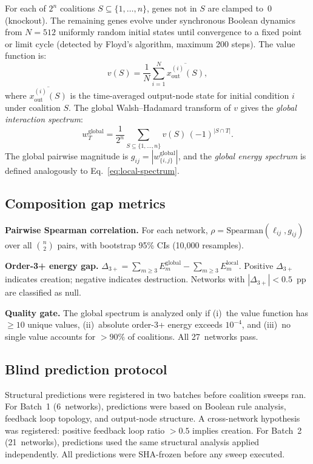 \documentclass[10pt]{article}
\begin{document}
For each of $2^n$ coalitions $S \subseteq \{1,\ldots,n\}$, genes not
in $S$ are clamped to~0 (knockout). The remaining genes evolve under
synchronous Boolean dynamics from $N = 512$ uniformly random initial
states until convergence to a fixed point or limit cycle (detected by
Floyd's algorithm, maximum 200 steps). The value function is:
%
\begin{equation}
\label{eq:value}
v(S) = \frac{1}{N} \sum_{i=1}^{N}
\overline{x_{\mathrm{out}}^{(i)}(S)},
\end{equation}
%
where $\overline{x_{\mathrm{out}}^{(i)}(S)}$ is the time-averaged
output-node state for initial condition $i$ under coalition $S$. The
global Walsh--Hadamard transform of $v$ gives the \emph{global
interaction spectrum}:
%
\begin{equation}
\label{eq:global-wht}
w_T^{\mathrm{global}} = \frac{1}{2^n} \sum_{S \subseteq \{1,\ldots,n\}}
v(S)\,(-1)^{|S \cap T|}.
\end{equation}
%
The global pairwise magnitude is
$g_{ij} = |w_{\{i,j\}}^{\mathrm{global}}|$, and the
\emph{global energy spectrum} is defined analogously to
Eq.~\ref{eq:local-spectrum}.


\subsection{Composition gap metrics}
\label{sec:metrics}

\textbf{Pairwise Spearman correlation.}
For each network, $\rho = \mathrm{Spearman}(\ell_{ij}, g_{ij})$ over
all $\binom{n}{2}$ pairs, with bootstrap 95\% CIs (10{,}000
resamples).

\textbf{Order-3+ energy gap.}
$\Delta_{3+} = \sum_{m \geq 3} E_m^{\mathrm{global}}
- \sum_{m \geq 3} E_m^{\mathrm{local}}.$
Positive $\Delta_{3+}$ indicates creation; negative indicates
destruction. Networks with $|\Delta_{3+}| < 0.5$~pp are classified as
null.

\textbf{Quality gate.}
The global spectrum is analyzed only if (i)~the value function has
$\geq 10$ unique values, (ii)~absolute order-3+ energy exceeds
$10^{-4}$, and (iii)~no single value accounts for $> 90\%$ of
coalitions. All 27~networks pass.


\subsection{Blind prediction protocol}
\label{sec:blind}

Structural predictions were registered in two batches before coalition
sweeps ran. For Batch~1 (6~networks), predictions were based on
Boolean rule analysis, feedback loop topology, and output-node
structure. A cross-network hypothesis was registered: positive
feedback loop ratio $> 0.5$ implies creation. For Batch~2
(21~networks), predictions used the same structural analysis applied
independently. All predictions were SHA-frozen before any sweep
executed.
\end{document}

